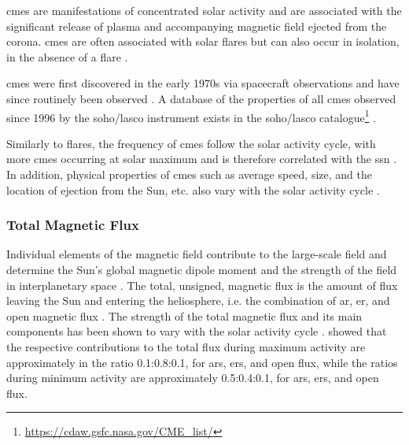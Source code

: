 \glspl{cme} are manifestations of concentrated solar activity and are associated with the significant release of plasma and accompanying magnetic field ejected from the corona. \glspl{cme} are often associated with solar flares but can also occur in isolation, in the absence of a flare \citep{hathaway_solar_2015}.

\glspl{cme} were first discovered in the early 1970s via spacecraft observations and have since routinely been observed \citep{hathaway_solar_2015}. A database of the properties of all \glspl{cme} observed since 1996 by the \gls{soho/lasco} instrument exists in the \gls{soho/lasco} catalogue\footnote{\url{https://cdaw.gsfc.nasa.gov/CME_list/}} \citep{yashiro_catalog_2004, gopalswamy_soholasco_2009}. 

Similarly to flares, the frequency of \glspl{cme} follow the solar activity cycle, with more \glspl{cme} occurring at solar maximum \citep{gopalswamy_corona_2010} and is therefore correlated with the \gls{ssn} \citep{webb_solar_1994}. In addition, physical properties of \glspl{cme} such as average speed, size, and the location of ejection from the Sun, etc. also vary with the solar activity cycle \citep{yashiro_catalog_2004}.



\subsubsection*{Total Magnetic Flux}

Individual elements of the magnetic field contribute to the large-scale field and determine the Sun's global magnetic dipole moment and the strength of the field in interplanetary space  \citep{lockwood_doubling_1999, solanki_evolution_2000}. The total, unsigned, magnetic flux is the amount of flux leaving the Sun and entering the heliosphere, i.e. the combination of \gls{ar}, \gls{er}, and open magnetic flux \citep{lockwood_doubling_1999}. The strength of the total magnetic flux and its main components has been shown to vary with the solar activity cycle \citep{solanki_secular_2002, vieira_evolution_2010, chaplin_sensitivity_2019}. \citet{vieira_evolution_2010} showed that the respective contributions to the total flux during maximum activity are approximately in the ratio 0.1:0.8:0.1, for \glspl{ar}, \glspl{er}, and open flux, while the ratios during minimum activity are approximately 0.5:0.4:0.1, for \glspl{ar}, \glspl{er}, and open flux. %



